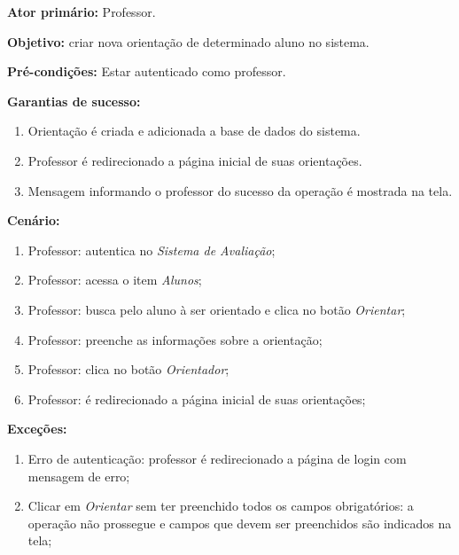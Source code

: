 \documentclass[
  12pt,       %
  openright,      %
  oneside,      %
  a4paper,      %
  english,      %
  french,        %
  spanish,     %
  brazil        %
  ]{abntex2-decsi}
\begin{document}
\begin{apendicesenv}
	\textbf{Ator primário:} Professor.
				
    \textbf{Objetivo:} criar nova orientação de determinado aluno no sistema.
    
	\textbf{Pré-condições:} Estar autenticado como professor.
		
	\textbf{Garantias de sucesso:} 
        
            \begin{enumerate}
            
            \item Orientação é criada e adicionada a base de dados do sistema.  
            \item Professor é redirecionado a página inicial de suas orientações.
            \item Mensagem informando o professor do sucesso da operação é mostrada na tela.
            
            \end{enumerate}
        
		\textbf{Cenário:}
		
		\begin{enumerate}
			\item Professor: autentica no \textit{Sistema de Avaliação};           
			\item Professor: acessa o item \textit{Alunos};
            \item Professor: busca pelo aluno à ser orientado e clica no botão \textit{Orientar};
			\item Professor: preenche as informações sobre a orientação;
			\item Professor: clica no botão \textit{Orientador};
            \item Professor: é redirecionado a página inicial de suas orientações;
		\end{enumerate}
		
		\textbf{Exceções:}
		
			\begin{enumerate}	
				\item Erro de autenticação: professor é redirecionado a página de login com mensagem de erro;
				\item Clicar em \textit{Orientar} sem ter preenchido todos os campos obrigatórios: a operação não prossegue e campos que devem ser preenchidos são indicados na tela;
			\end{enumerate}

	\newpage


\end{apendicesenv}
\end{document}
